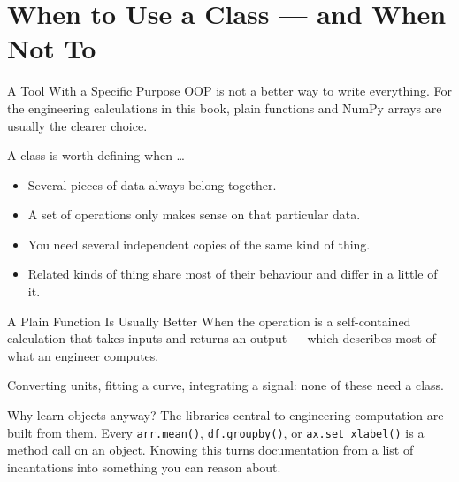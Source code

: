 \documentclass[9pt,aspectratio=169,xcolor=table]{beamer}
\begin{document}
\section{When to Use a Class --- and When Not To}

\begin{frame}{A Tool With a Specific Purpose}
    \leavevmode
    OOP is not a better way to write everything. For the engineering
    calculations in this book, plain functions and NumPy arrays are
    usually the clearer choice.

    \vspace{3mm}
    \begin{block}{A class is worth defining when \ldots}
        \begin{itemize}\itemsep2pt
            \small
            \item Several pieces of data always belong together.
            \item A set of operations only makes sense on that
                  particular data.
            \item You need several independent copies of the same kind
                  of thing.
            \item Related kinds of thing share most of their behaviour
                  and differ in a little of it.
        \end{itemize}
    \end{block}
\end{frame}

\begin{frame}{A Plain Function Is Usually Better}
    \leavevmode
    When the operation is a self-contained calculation that takes inputs
    and returns an output --- which describes \alert{most} of what an
    engineer computes.

    \vspace{2mm}
    {\small Converting units, fitting a curve, integrating a signal: none
    of these need a class.}

    \vspace{4mm}
    \begin{alertblock}{Why learn objects anyway?}
        The libraries central to engineering computation are built from
        them. Every \texttt{arr.mean()}, \texttt{df.groupby()}, or
        \texttt{ax.set\_xlabel()} is a method call on an object. Knowing
        this turns documentation from a list of incantations into
        something you can reason about.
    \end{alertblock}
\end{frame}
\end{document}
